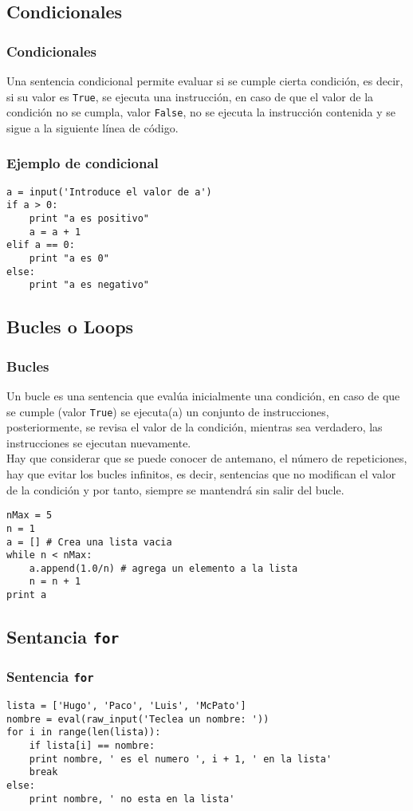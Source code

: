 \documentclass[12pt]{beamer}
\begin{document}
\subsection{Condicionales}
\begin{frame}
\frametitle{Condicionales}
Una sentencia condicional permite evaluar si se cumple cierta condici\'{o}n, es decir, si su valor es \texttt{True}, se ejecuta una instrucci\'{o}n, en caso de que el valor de la condici\'{o}n no se cumpla, valor \texttt{False}, no se ejecuta la instrucci\'{o}n contenida y se sigue a la siguiente l\'{i}nea de c\'{o}digo.
\end{frame}
\begin{frame}[fragile]
\frametitle{Ejemplo de condicional}
\begin{lstlisting}
a = input('Introduce el valor de a')
if a > 0:
    print "a es positivo"
    a = a + 1
elif a == 0: 
    print "a es 0"
else:
    print "a es negativo"
\end{lstlisting}
\end{frame}
\subsection{Bucles o Loops}
\begin{frame}
\frametitle{Bucles}
Un bucle es una sentencia que eval\'{u}a inicialmente una condici\'{o}n, en caso de que se cumple (valor \texttt{True}) se ejecuta(a) un conjunto de instrucciones, posteriormente, se revisa el valor de la condici\'{o}n, mientras sea verdadero, las instrucciones se ejecutan nuevamente.
\\
\bigskip
Hay que considerar que se puede conocer de antemano, el n\'{u}mero de repeticiones, hay que evitar los bucles infinitos, es decir, sentencias que no modifican el valor de la condici\'{o}n y por tanto, siempre se mantendr\'{a} sin salir del bucle.
\end{frame}
\begin{frame}[fragile]
\begin{lstlisting}
nMax = 5
n = 1
a = [] # Crea una lista vacia
while n < nMax:
    a.append(1.0/n) # agrega un elemento a la lista
    n = n + 1
print a
\end{lstlisting}
\end{frame}
\subsection{Sentancia \texttt{for}}
\begin{frame}[fragile]
\frametitle{Sentencia \texttt{for}}
\begin{lstlisting}
lista = ['Hugo', 'Paco', 'Luis', 'McPato']
nombre = eval(raw_input('Teclea un nombre: '))
for i in range(len(lista)):
    if lista[i] == nombre:
    print nombre, ' es el numero ', i + 1, ' en la lista'
    break
else:
    print nombre, ' no esta en la lista'
\end{lstlisting}
\end{frame}
\end{document}
